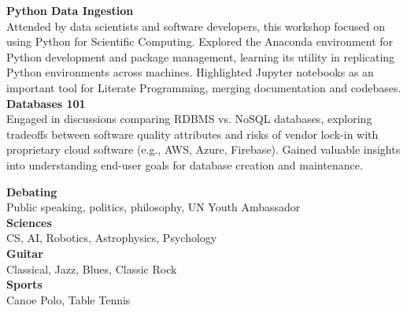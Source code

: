 \documentclass[9pt]{developercv}
\begin{document}
\textbf{Python Data Ingestion} \\
Attended by data scientists and software developers, this workshop focused on using Python for Scientific Computing. Explored the Anaconda environment for Python development and package management, learning its utility in replicating Python environments across machines. Highlighted Jupyter notebooks as an important tool for Literate Programming, merging documentation and codebases. \\

\textbf{Databases 101} \\
Engaged in discussions comparing RDBMS vs. NoSQL databases, exploring tradeoffs between software quality attributes and risks of vendor lock-in with proprietary cloud software (e.g., AWS, Azure, Firebase). Gained valuable insights into understanding end-user goals for database creation and maintenance.



{
  \textbf{Debating} \\
 Public speaking, politics, philosophy, UN Youth Ambassador\\
}
{
  \textbf{Sciences} \\
 CS, AI, Robotics, Astrophysics, Psychology \\
}
{
  \textbf{Guitar} \\
 Classical, Jazz, Blues, Classic Rock \\
}
{
  \textbf{Sports} \\
 Canoe Polo, Table Tennis
}




\end{document}
